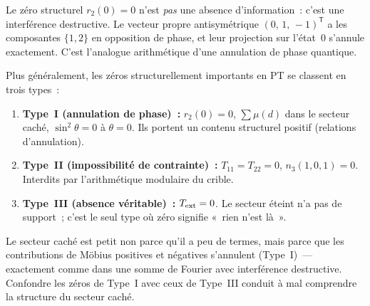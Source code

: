 \documentclass[12pt,a4paper]{article}
\begin{document}
\begin{remarque}\mBR
\label{rem:zero_phase}
Le zéro structurel $r_2(0) = 0$ n'est \emph{pas} une absence
d'information~: c'est une interférence destructive. Le vecteur propre
antisymétrique $(0,\,1,\,-1)^{\!\mathsf{T}}$ a les composantes
$\{1,2\}$ en opposition de phase, et leur projection sur l'état~$0$
s'annule exactement. C'est l'analogue arithmétique d'une annulation
de phase quantique.

Plus généralement, les zéros structurellement importants en PT se
classent en trois types~:
\begin{enumerate}[nosep]
\item \textbf{Type~I (annulation de phase)~:} $r_2(0) = 0$,
  $\sum\mu(d)$ dans le secteur caché, $\sin^2\!\theta = 0$ à
  $\theta = 0$. Ils portent un contenu structurel positif (relations
  d'annulation).
\item \textbf{Type~II (impossibilité de contrainte)~:}
  $T_{11} = T_{22} = 0$, $n_3(1,0,1) = 0$. Interdits par
  l'arithmétique modulaire du crible.
\item \textbf{Type~III (absence véritable)~:} $T_{\rm ext} = 0$.
  Le secteur éteint n'a pas de support~; c'est le seul type où
  zéro signifie «~rien n'est là~».
\end{enumerate}
Le secteur caché est petit non parce qu'il a peu de termes, mais
parce que les contributions de Möbius positives et négatives
s'annulent (Type~I)~--- exactement comme dans une somme de Fourier
avec interférence destructive. Confondre les zéros de Type~I avec
ceux de Type~III conduit à mal comprendre la structure du secteur
caché.
\end{remarque}
\end{document}
